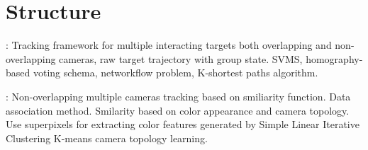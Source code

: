 \chapter{Structure}

\cite{Zhang15a}: Tracking framework for multiple interacting targets both overlapping and non-overlapping cameras, raw target trajectory with group state. SVMS, homography-based voting schema, networkflow problem, K-shortest paths algorithm.

\cite{Choi16}: Non-overlapping multiple cameras tracking based on smiliarity function. Data association method. Smilarity based on color appearance and camera topology. Use superpixels for extracting color features generated by Simple Linear Iterative Clustering K-means camera topology learning.


